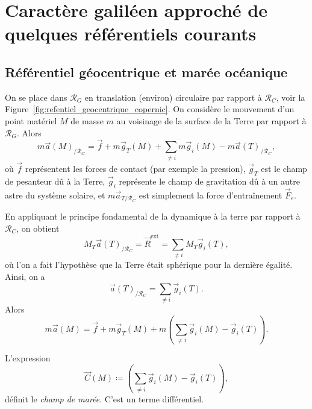 \section[Caractère galiléen de certains référentiels]{Caractère galiléen approché de quelques référentiels courants}

    \subsection{Référentiel géocentrique et marée océanique}

        On se place dans $\mathcal{R}_{G}$ en translation (environ) circulaire par rapport à $\mathcal{R}_{C}$, voir la Figure~\ref{fig:refentiel_geocentrique_copernic}. On considère le mouvement d'un point matériel $M$ de masse $m$ au voisinage de la surface de la Terre par rapport à $\mathcal{R}_{G}$. Alors 
        \begin{equation*}
            m\vec{a}(M)_{/\mathcal{R}_{G}}=\vec{f}+m\vec{g}_{T}(M)+\sum_{\neq i}m\vec{g}_{i}(M)-m\vec{a}(T)_{/\mathcal{R}_C},
        \end{equation*}
        où $\vec{f}$ représentent les forces de contact (par exemple la pression), $\vec{g}_{T}$ est le champ de pesanteur dû à la Terre, $\vec{g}_{i}$ représente le champ de gravitation dû à un autre astre du système solaire, et $m\vec{a}_{T/\mathcal{R}_{C}}$ est simplement la force d'entraînement $\vec{F}_{e}$.

        En appliquant le principe fondamental de la dynamique à la terre par rapport à $\mathcal{R}_{C}$, on obtient 
        \begin{equation*}
            M_{T}\vec{a}(T)_{/\mathcal{R}_{C}}=\vec{R}^{\text{ext}}=\sum_{\neq i}M_T\vec{g}_i(T),
        \end{equation*}
        où l'on a fait l'hypothèse que la Terre était sphérique pour la dernière égalité. Ainsi, on a 
        \begin{equation*}
            \vec{a}(T)_{/\mathcal{R}_C}=\sum_{\neq i}\vec{g}_i(T).
        \end{equation*}
        Alors 
        \begin{equation*}
            \boxed{m\vec{a}(M)=\vec{f}+m\vec{g}_{T}(M)+m\left(\sum_{\neq i}\vec{g}_{i}(M)-\vec{g}_{i}(T)\right).}
        \end{equation*}

        \begin{definition}
            L'expression
            \begin{equation*}
                \vec{C}(M)\coloneqq\left(\sum_{\neq i}\vec{g}_{i}(M)-\vec{g}_{i}(T)\right),
            \end{equation*}
            définit le \textit{champ de marée}. C'est un terme différentiel.
        \end{definition}

